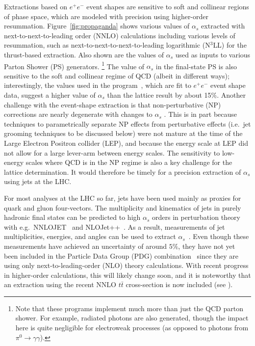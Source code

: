 Extractions based on $e^+e^-$ event shapes are sensitive to soft and collinear regions of phase space, which are modeled with precision
using higher-order resummation.
%
Figure~\ref{fig:propaganda} shows various values of $\alpha_s$ extracted with next-to-next-to-leading order (NNLO) calculations including various levels of resummation, such as next-to-next-to-next-to-leading logarithmic (N$^3$LL) for the thrust-based extraction.
%
Also shown are the values of $\alpha_s$ used as inputs to various Parton Shower (PS) generators.%
\footnote{Note that these programs implement much more than just the QCD parton shower.  For example, radiated photons are also generated, though the impact here is quite negligible for electroweak processes (as opposed to photons from $\pi^0\rightarrow\gamma\gamma$).}
%
The value of $\alpha_s$ in the final-state PS is also sensitive to the soft and collinear regime of QCD (albeit in different ways); interestingly, the values used in the \pythia program~\cite{Sjostrand:2006za,Sjostrand:2007gs}, which are fit to $e^+e^-$ event shape data, suggest a higher value of $\alpha_s$ than the lattice result by about 15\%.
%
Another challenge with the event-shape extraction is that non-perturbative (NP) corrections are nearly degenerate with changes to $\alpha_s$ \cite{Abbate:2010xh}.
%
This is in part because techniques to parametrically separate NP effects from perturbative effects (i.e.~jet grooming techniques to be discussed below) were not mature at the time of the Large Electron Positron collider (LEP), and because the energy scale at LEP did not allow for a large lever-arm between energy scales.
%
The sensitivity to low-energy scales where QCD is in the NP regime is also a key challenge for the lattice determination.
%
It would therefore be timely for a precision extraction of $\alpha_s$ using jets at the LHC.

For most analyses at the LHC so far, jets have been used mainly as proxies for quark and gluon four-vectors.
%
The multiplicity and kinematics of jets in purely hadronic final states can be predicted to high $\alpha_s$ orders in perturbation theory with e.g.\ NNLOJET~\cite{Currie:2016bfm,Currie:2017ctp} and NLOJet++~\cite{Nagy:2001fj,Nagy:2003tz}.
%
As a result, measurements of jet multiplicities, energies, and angles can be used to extract $\alpha_s$~\cite{ATLAS:2015yaa,Aaboud:2017fml,Khachatryan:2014waa,CMS:2014mna,Chatrchyan:2013txa}.
%
Even though these measurements have achieved an uncertainty of around $5\%$, they have not yet been included in the Particle Data Group (PDG) combination~\cite{Olive:2016xmw} since they are using only next-to-leading-order (NLO) theory calculations.
%
With recent progress in higher-order calculations, this will likely change soon, and it is noteworthy that an extraction using the recent NNLO $t\bar{t}$ cross-section  is now included (see ).

